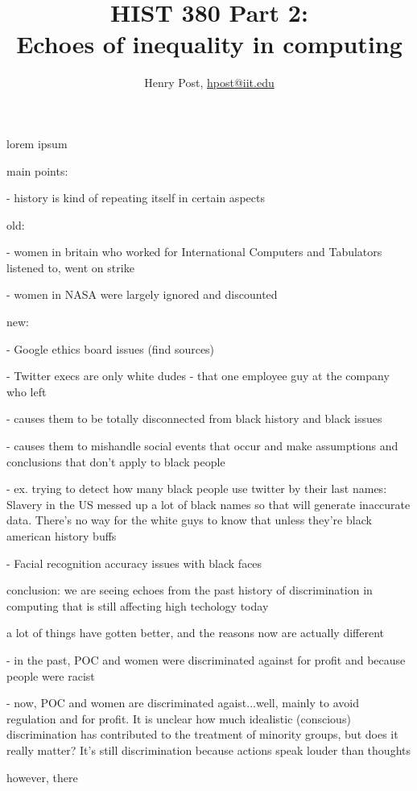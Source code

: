 \documentclass[a4paper,12pt]{article}
\title{HIST 380 Part 2: \\ Echoes of inequality in computing }
\author{Henry Post, \url{hpost@iit.edu}}
\begin{document}
\maketitle

\newpage

lorem ipsum

main points:

- history is kind of repeating itself in certain aspects

old:

- women in britain who worked for International Computers and Tabulators listened to, went on strike

- women in NASA were largely ignored and discounted

new:

- Google ethics board issues (find sources)

- Twitter execs are only white dudes
  - that one employee guy at the company who left

  - causes them to be totally disconnected from black history and black issues

  - causes them to mishandle social events that occur and make assumptions and conclusions that don't apply to black 
people

  - ex. trying to detect how many black people use twitter by their last names: Slavery in the US messed up a lot of black names so that will generate inaccurate data. There's no way for the white guys to know that unless they're black american history buffs

- Facial recognition accuracy issues with black faces

conclusion: we are seeing echoes from the past history of discrimination in computing that is still affecting high techology today

a lot of things have gotten better, and the reasons now are actually different

- in the past, POC and women were discriminated against for profit and because people were racist

- now, POC and women are discriminated agaist...well, mainly to avoid regulation and for profit. It is unclear how much idealistic (conscious) discrimination has contributed to the treatment of minority groups, but does it really matter? It's still discrimination because actions speak louder than thoughts

however, there 


\newpage

\begin{thebibliography}{9}


\end{thebibliography}

\newpage

\end{document}
